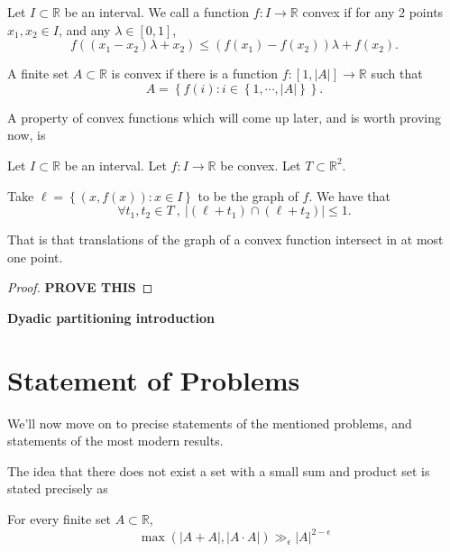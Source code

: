 \documentclass[12pt]{amsart}
\begin{document}
Let \(I \subset \mathbb{R} \) be an interval. 
    We call a function \(f: I \to \mathbb{R} \) convex if for
    any 2 points \(x_1,x_2 \in I\), and any \(\lambda \in [0,1]\),
    \[
        f((x_1-x_2)\lambda + x_2) \leq \left( f(x_1)-f(x_2) \right) \lambda + f(x_2)
    .\]

    A finite set \(A \subset \mathbb{R}\) is convex if there is a function \(f: [1, \left\lvert A \right\rvert ] \to \mathbb{R} \)
such that
\[
    A = \left\{ f(i) : i \in \left\{ 1, \cdots , \left\lvert A \right\rvert  \right\}  \right\} 
.\]

A property of convex functions which will come up later, and is worth proving now, is
\begin{lemma}
Let \(I \subset \mathbb{R} \) be an interval. Let \(f : I \to \mathbb{R} \) be convex. Let \(T \subset \mathbb{R} ^{2}\).

Take \(\ell  = \left\{ (x,f(x)) : x \in I \right\} \) to be the graph of \(f\). We have that
\[
    \forall t_1,t_2 \in T ~,~ \left\lvert \left( \ell + t_1 \right) \cap \left( \ell +  t_2 \right)  \right\rvert   \leq  1
.\]

That is that translations of the graph of a convex function intersect in at most one point.
\end{lemma}

\begin{proof}
\textbf{PROVE THIS}
\end{proof}

\textbf{Dyadic partitioning introduction}



\section{Statement of Problems}

We'll now move on to precise statements of the mentioned problems, and statements of the most modern results.

The idea that there does not exist a set with a small sum and product set is
stated precisely as
\begin{conjecture}
For every finite set \(A \subset \mathbb{R} \),
\[
    \max \left( \left\lvert A+A \right\rvert, \left\lvert A \cdot A \right\rvert  \right) \gg_{\epsilon}  \left\lvert A \right\rvert^{2-\epsilon}
\]
\end{conjecture}
\end{document}
